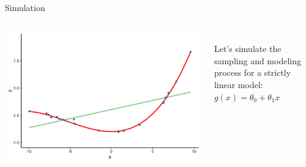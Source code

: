 \documentclass[aspectratio=169]{../latex_main/tntbeamer}  %
\begin{document}
	
	\begin{frame}[c]{Simulation}
	  \begin{columns}
	      \begin{column}{.6\textwidth}

	               \includegraphics[scale=.5]{Bild9}
	               
	      \end{column}
	      
	      \begin{column}{.4\textwidth}
	      \\
	      \bigskip
	      \bigskip
	      \bigskip
	            Let’s simulate the sampling and modeling process for a strictly \alert{linear model}:\\
	            $g(x) = \theta_0 + \theta_1x$
	      \end{column}
	  \end{columns}
	\end{frame}
	
\end{document}
